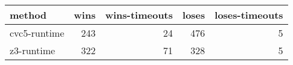 \begin{tabular}{lrrrr}
\hline
 method       &   wins &   wins-timeouts &   loses &   loses-timeouts \\
\hline
 cvc5-runtime &    243 &              24 &     476 &                5 \\
 z3-runtime   &    322 &              71 &     328 &                5 \\
\hline
\end{tabular}
